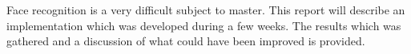 Face recognition is a very difficult subject to master. This report will describe an implementation which was developed during a few weeks. The results which was gathered and a discussion of what could have been improved is provided.

